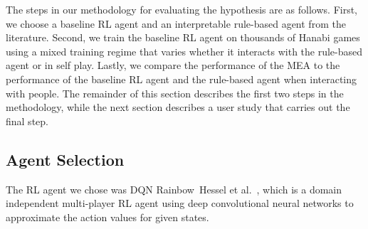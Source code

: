\documentclass[letterpaper]{article} %
\begin{document}



The steps in our methodology for evaluating the hypothesis are as follows. First, we choose a baseline  RL agent and an interpretable rule-based agent from the literature. %
Second,
we train the baseline RL agent on  thousands of Hanabi games  using a mixed training regime that varies whether it interacts with the rule-based agent or in self play.
Lastly, we compare the performance of the MEA to the performance of the baseline RL agent and the rule-based agent when interacting with people. The remainder of this section describes the
first two steps in the methodology, while the next section describes a user study  that carries out  the  final step.

\subsection{Agent Selection}
The   RL agent we  chose was DQN Rainbow~Hessel et al.~,  which  is a domain independent multi-player RL agent using deep convolutional neural networks to approximate the action values for given states.
\end{document}
